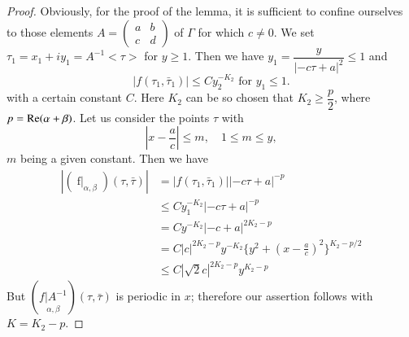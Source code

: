 \begin{proof}
Obviously, for the proof of the lemma, it is sufficient to confine
ourselves to those elements $A=\left(\begin{smallmatrix}
a&b\\c&d \end{smallmatrix} \right)$ of $\Gamma$ for which $c\neq
0$. We set $\tau_1=x_1+iy_1=A^{-1}<\tau>$ for $y \geq 1$. Then we have
$y_1 =\dfrac{y}{|-c\tau+a|^2} \leq 1$ and 
$$
|f(\tau_1,\bar{\tau}_1)| \leq C y^{-K_2}_2 \text{ for } y_1 \leq 1. 
$$
with a certain constant $C$. Here $K_2$ can be so chosen that $K_2
\geq \dfrac{p}{2}$, where $p=\operatorname{Re}(\alpha+\beta)$. Let us consider the
points $\tau$ with 
$$
|x-\frac{a}{c}| \leq m, \quad 1 \leq m \leq y,
$$
$m$ being a given constant. Then we have 
\begin{align*}
|(\mathop{f|A^{-1}}_{\alpha,\beta}) (\tau,\bar{\tau})| & =
|f(\tau_1,\bar{\tau}_1)||-c\tau+a|^{-p}\\
& \leq C y^{-K_2}_{1} |-c\tau+a|^{-p}\\
& = C y^{-K_2} |-c+a|^{2K_2-p}\\
& = C |c|^{2K_2-p} y^{-K_2} \{y^2+(x-\frac{a}{c})^2\}^{K_2-p/2} \\
& \leq C |\surd 2 c|^{2K_2-p} y^{K_2-p}
\end{align*}
But $(\underset{\alpha,\beta}{f|A^{-1}})(\tau,\bar{\tau})$ is periodic
in $x$; therefore our assertion follows with $K=K_2-p$.


\end{proof}
